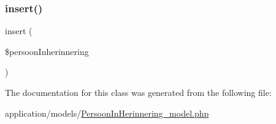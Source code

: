 \subsubsection{\texorpdfstring{insert()}{insert()}}
{\footnotesize\ttfamily insert (\begin{DoxyParamCaption}\item[{}]{\$persoon\+Inherinnering }\end{DoxyParamCaption})}



The documentation for this class was generated from the following file\+:\begin{DoxyCompactItemize}
\item 
application/models/\mbox{\hyperlink{_persoon_in_herinnering__model_8php}{Persoon\+In\+Herinnering\+\_\+model.\+php}}\end{DoxyCompactItemize}
